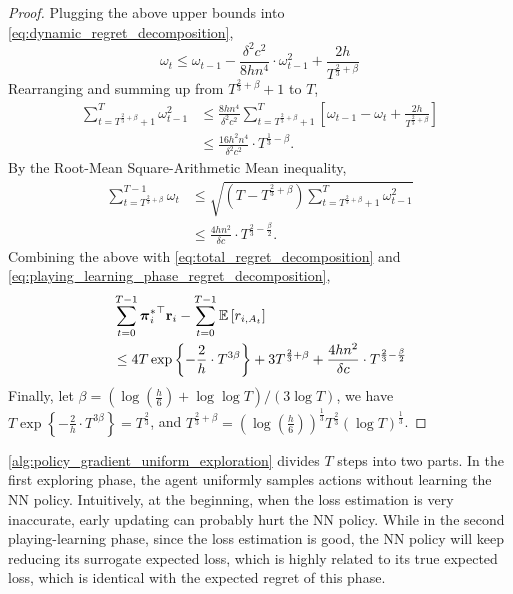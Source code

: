 \begin{proof}
Plugging the above upper bounds into \cref{eq:dynamic_regret_decomposition},
\begin{equation*}
    \omega_t \le \omega_{t-1} - \frac{\delta^2 c^2}{8 h n^4} \cdot \omega_{t-1}^2 + \frac{2h}{T^{\frac{2}{3} + \beta}}
\end{equation*}
Rearranging and summing up from $T^{\frac{2}{3} + \beta} + 1$ to $T$,
\begin{equation*}
\begin{split}
    \sum\limits_{t=T^{\frac{2}{3}+ \beta}+1}^{T}{\omega_{t-1}^2} &\le \frac{8 h n^4}{\delta^2 c^2} \sum\limits_{t=T^{\frac{2}{3}+ \beta}+1}^{T} { \left[ \omega_{t-1} - \omega_t + \frac{2h}{T^{\frac{2}{3} + \beta}} \right] } \\
    &\le \frac{16 h^2 n^4}{\delta^2 c^2} \cdot T^{\frac{1}{3} - \beta}.
\end{split}
\end{equation*}
By the Root-Mean Square-Arithmetic Mean inequality,
\begin{equation*}
\begin{split}
    \sum\limits_{t=T^{\frac{2}{3}+ \beta}}^{T-1}{\omega_{t}} &\le \sqrt{\left(T  - T^{\frac{2}{3}+ \beta} \right) \sum\limits_{t=T^{\frac{2}{3}+ \beta}+1}^{T}{\omega_{t-1}^2}} \\
    &\le \frac{4 h n^2}{\delta c} \cdot T^{\frac{2}{3} - \frac{\beta}{2}}.
\end{split}
\end{equation*}
Combining the above with \cref{eq:total_regret_decomposition} and \cref{eq:playing_learning_phase_regret_decomposition},
\begin{equation*}
\begin{split}
    &\sum\limits_{t=0}^{T-1}{ {{\boldsymbol{\pi}}_i^*}^\top {\mathbf{r}}_i } - \sum\limits_{t=0}^{T-1}{ {\mathbb{E}} \left[ r_{i, A_t} \right] } \\
    &\le  4 T \exp\left\{ - \frac{2}{h} \cdot  T^{3\beta} \right\} + 3 T^{\frac{2}{3} + \beta} + \frac{4 h n^2}{\delta c} \cdot T^{\frac{2}{3} - \frac{\beta}{2}}
\end{split}
\end{equation*}
Finally, let $\beta = \left( \log{\left(\frac{h}{6}\right) + \log{\log{T}} } \right)/\left(3 \log{T}\right)$, we have $T \exp\left\{ - \frac{2}{h} \cdot  T^{3\beta} \right\} = T^{\frac{2}{3}}$, and $T^{\frac{2}{3} + \beta} = \left( \log{\left(\frac{h}{6}\right)}\right)^{\frac{1}{3}} T^{\frac{2}{3}} \left(\log{T}\right)^{\frac{1}{3}}$.
\end{proof}

\cref{alg:policy_gradient_uniform_exploration} divides $T$ steps into two parts. In the first exploring phase, the agent uniformly samples actions without learning the NN policy. Intuitively, at the beginning, when the loss estimation is very inaccurate, early updating can probably hurt the NN policy.  While in the second playing-learning phase, since the loss estimation is good, the NN policy will keep reducing its surrogate expected loss, which is highly related to its true expected loss, which is identical with the expected regret of this phase.

